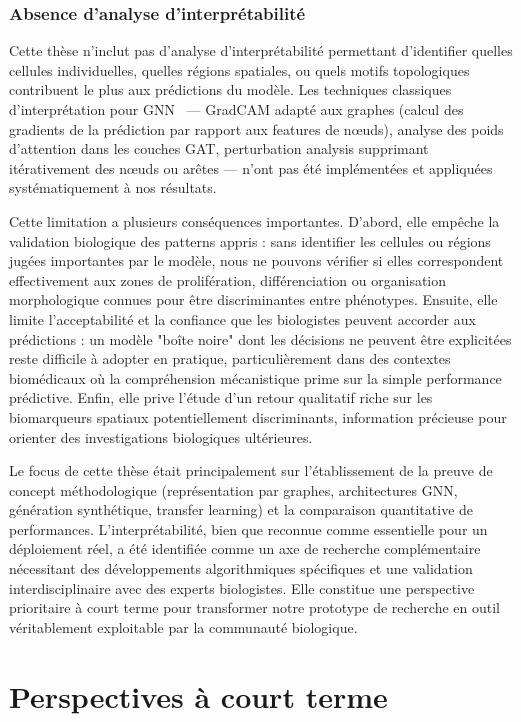 \subsubsection{Absence d'analyse d'interprétabilité}

Cette thèse n'inclut pas d'analyse d'interprétabilité permettant d'identifier quelles cellules individuelles, quelles régions spatiales, ou quels motifs topologiques contribuent le plus aux prédictions du modèle. Les techniques classiques d'interprétation pour GNN~\cite{Yuan2020,Pope2019} — GradCAM adapté aux graphes (calcul des gradients de la prédiction par rapport aux features de nœuds), analyse des poids d'attention dans les couches GAT, perturbation analysis supprimant itérativement des nœuds ou arêtes — n'ont pas été implémentées et appliquées systématiquement à nos résultats.

Cette limitation a plusieurs conséquences importantes. D'abord, elle empêche la validation biologique des patterns appris : sans identifier les cellules ou régions jugées importantes par le modèle, nous ne pouvons vérifier si elles correspondent effectivement aux zones de prolifération, différenciation ou organisation morphologique connues pour être discriminantes entre phénotypes. Ensuite, elle limite l'acceptabilité et la confiance que les biologistes peuvent accorder aux prédictions : un modèle "boîte noire" dont les décisions ne peuvent être explicitées reste difficile à adopter en pratique, particulièrement dans des contextes biomédicaux où la compréhension mécanistique prime sur la simple performance prédictive. Enfin, elle prive l'étude d'un retour qualitatif riche sur les biomarqueurs spatiaux potentiellement discriminants, information précieuse pour orienter des investigations biologiques ultérieures.

Le focus de cette thèse était principalement sur l'établissement de la preuve de concept méthodologique (représentation par graphes, architectures GNN, génération synthétique, transfer learning) et la comparaison quantitative de performances. L'interprétabilité, bien que reconnue comme essentielle pour un déploiement réel, a été identifiée comme un axe de recherche complémentaire nécessitant des développements algorithmiques spécifiques et une validation interdisciplinaire avec des experts biologistes. Elle constitue une perspective prioritaire à court terme pour transformer notre prototype de recherche en outil véritablement exploitable par la communauté biologique.

\section{Perspectives à court terme}

